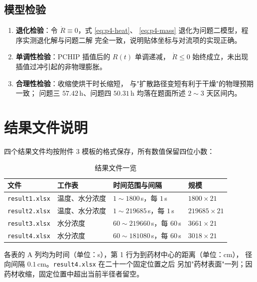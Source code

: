 \documentclass[12pt,a4paper]{ctexart}
\begin{document}
\subsection{模型检验}

\begin{enumerate}
  \item \textbf{退化检验}：令 $\dot R\equiv0$，式 \eqref{eq:p4-heat}、
        \eqref{eq:p4-mass} 退化为问题二模型，程序实测退化解与问题二解
        完全一致，说明贴体坐标与对流项的实现正确。
  \item \textbf{单调性检验}：PCHIP 插值后的 $R(t)$ 单调递减，
        $\dot R\le0$ 始终成立，未出现插值过冲引起的非物理膨胀。
  \item \textbf{合理性检验}：收缩使烘干时长缩短，
        与"扩散路径变短有利于干燥"的物理预期一致；
        问题三 $57.42$\,h、问题四 $50.31$\,h 均落在题面所述 $2\sim3$ 天区间内。
\end{enumerate}

\section{结果文件说明}

四个结果文件均按附件 3 模板的格式保存，所有数值保留四位小数：

\begin{table}[htbp]
  \centering
  \caption{结果文件一览}
  \label{tab:files}
  \small
  \begin{tabular}{llll}
    \toprule
    文件 & 工作表 & 时间范围与间隔 & 规模 \\
    \midrule
    \texttt{result1.xlsx} & 温度、水分浓度 & $1\sim1800$\,s，每 $1$\,s & $1800\times21$ \\
    \texttt{result2.xlsx} & 温度、水分浓度 & $1\sim219685$\,s，每 $1$\,s & $219685\times21$ \\
    \texttt{result3.xlsx} & 水分浓度 & $60\sim219660$\,s，每 $60$\,s & $3661\times21$ \\
    \texttt{result4.xlsx} & 水分浓度 & $60\sim181080$\,s，每 $60$\,s & $3018\times21$\\
    \bottomrule
  \end{tabular}
\end{table}

各表的 A 列均为时间（单位：s），第 1 行为到药材中心的距离（单位：cm），
径向间隔 $0.1$\,cm。\texttt{result4.xlsx} 在二十一个固定位置之后
另加"药材表面"一列；因药材收缩，固定位置中超出当前半径者留空。
\end{document}
